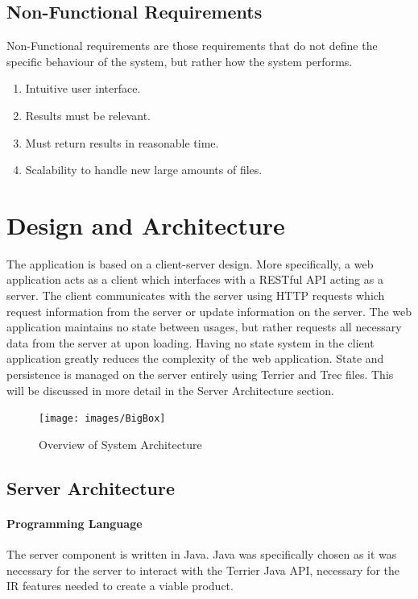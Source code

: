 \documentclass{l4proj}
\begin{document}
\subsection{Non-Functional Requirements}
Non-Functional requirements are those requirements that do not define the specific behaviour of the system, but rather how the system performs.
\begin{enumerate}[label=\textbf{NF.\arabic*}]
\item Intuitive user interface.
\item Results must be relevant.
\item Must return results in reasonable time.
\item Scalability to handle new large amounts of files. 
\end{enumerate}

\section{Design and Architecture}
The application is based on a client-server design. More specifically, a web application acts as a client which interfaces with a RESTful API acting as a server.
The client communicates with the server using HTTP requests which request information from the server or update information on the server.
The web application maintains no state between usages, but rather requests all necessary data from the server at upon loading. Having no state system in the client application greatly reduces the complexity of the web application.
State and persistence is managed on the server entirely using Terrier and Trec files. This will be discussed in more detail in the Server Architecture section.


\begin{figure}[H]
\centering
\texttt{[image: images/BigBox]}
\caption{Overview of System Architecture}
\label{architecture}
\end{figure}


\subsection{Server Architecture}
\paragraph{Programming Language}
The server component is written in Java. Java was specifically chosen as it was necessary for the server to interact with the Terrier Java API, necessary for the IR features needed to create a viable product.
\end{document}
